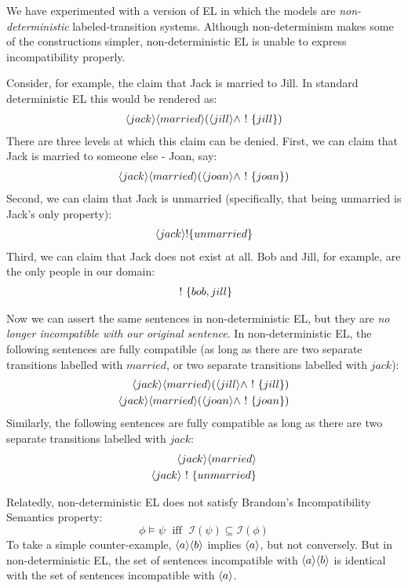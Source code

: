 We have experimented with a version of EL in which the models are \emph{non-deterministic} labeled-transition systems.
Although non-determinism makes some of the constructions simpler, non-deterministic EL is unable to express incompatibility properly.

Consider, for example, the claim that Jack is married to Jill. 
In standard deterministic EL this would be rendered as:
\begin{eqnarray*}
\langle jack \rangle \langle married \rangle (\langle jill \rangle \land \ ! \  \{jill\})
\end{eqnarray*}
There are three levels at which this claim can be denied.
First, we can claim that Jack is married to someone else - Joan, say:
\begin{eqnarray*}
\langle jack \rangle \langle married \rangle (\langle joan \rangle \land \ ! \  \{joan\})
\end{eqnarray*}
Second, we can claim that Jack is unmarried (specifically, that being unmarried is Jack's only property):
\begin{eqnarray*}
\langle jack \rangle !\{unmarried\}
\end{eqnarray*}
Third, we can claim that Jack does not exist at all. Bob and Jill, for example, are the only people in our domain:
\begin{eqnarray*}
\ ! \  \{bob, jill\}
\end{eqnarray*}

Now we can assert the same sentences in non-deterministic EL, but they are \emph{no longer incompatible with our original sentence}.
In non-deterministic EL, the following sentences are fully compatible (as long as there are two separate transitions labelled with $married$, or two separate transitions labelled with $jack$):
\begin{eqnarray*}
\langle jack \rangle \langle married \rangle (\langle jill \rangle \land \ ! \  \{jill\}) \\
\langle jack \rangle \langle married \rangle (\langle joan \rangle \land \ ! \  \{joan\})
\end{eqnarray*}
Similarly, the following sentences are fully compatible as long as there are two separate transitions labelled with $jack$:
\begin{eqnarray*}
\langle jack \rangle \langle married \rangle \\
\langle jack \rangle \ ! \  \{unmarried\}
\end{eqnarray*}

Relatedly, non-deterministic EL does not satisfy Brandom's Incompatibility Semantics property:
\[
\phi \models \psi \; \mbox{ iff } \; \mathcal{I}(\psi) \subseteq \mathcal{I}(\phi)
\]
To take a simple counter-example, $\MAY{a}\MAY{b}$ implies $\MAY{a}$, but not conversely.
But in non-deterministic EL, the set of sentences incompatible with $\MAY{a}\MAY{b}$ is identical with the set of sentences incompatible with  $\MAY{a}$.




